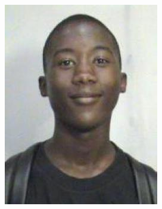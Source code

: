 \documentclass[12pt]{article}
\begin{document}
	\begin{figure}[ht!]
		\centering
		\includegraphics[scale=0.5]{./Pictures/AlfredNgako.jpg}
	\end{figure}
		
\end{document}
